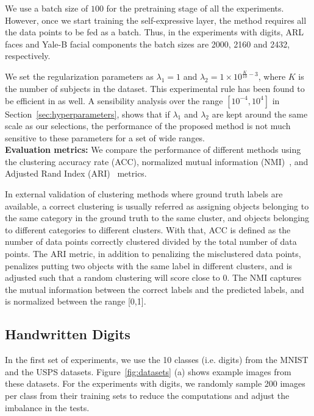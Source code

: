 \documentclass[journal]{IEEEtran}
\begin{document}
We use a batch size of $100$ for the pretraining stage of all the experiments.  However, once we start training the self-expressive layer, the method requires all the data points to be fed as a batch. Thus, in the experiments with digits, ARL faces and Yale-B facial components the batch sizes are 2000, 2160 and 2432, respectively.

We set the regularization parameters as $\lambda_1 =1$ and $\lambda_2 = 1 \times 10^{\frac{K}{10}-3}$,  where $K$ is the number of subjects in the dataset.   This experimental rule has been found to be efficient in \cite{deepsc17nips} as well.    A sensibility analysis over the range $[10^{-4},10^{4}]$ in Section~\ref{sec:hyperparameters}, shows that if $\lambda_1$ and $\lambda_2$ are kept around the same scale as our selections, the performance of the proposed method is not much sensitive to these parameters for a set of wide ranges. \\

\noindent\textbf{Evaluation metrics: } We compare the performance of different methods using the clustering accuracy rate (ACC),  normalized mutual information (NMI)~\cite{vinh2010information}, and Adjusted Rand Index (ARI)~\cite{rand1971objective} metrics.

In external validation of clustering methods where ground truth labels are available,  a correct clustering is usually referred as assigning objects belonging to the same category in the ground truth to the same cluster, and objects belonging to different categories to different clusters.  With that, ACC is defined as the number of data points correctly clustered divided by the total number of data points.  The ARI metric, in addition to penalizing the misclustered data points, penalizes putting two objects with the same label in different clusters, and is adjusted such that a random clustering will score close to 0.   The NMI captures the mutual information between the correct labels and the predicted labels, and is normalized between the range [0,1].


\subsection{Handwritten Digits}
In the first set of experiments, we use the 10 classes (i.e. digits) from the  MNIST  and the USPS datasets.  Figure~\ref{fig:datasets} (a) shows example images from these datasets.		       For the experiments with digits, we randomly sample 200 images per class from their training sets to reduce the computations and adjust the imbalance in the tests.		    
\end{document}
